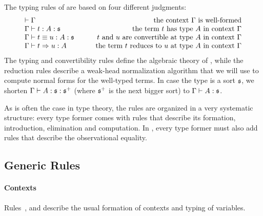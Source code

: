 The typing rules of \SetoidCC are based on four different judgments: 
\[
  \begin{array}{lr}
	\vdash \Gamma & \text{the context \( \Gamma \) is well-formed} \\
	\Gamma \vdash t : A : \mathfrak{s} & \text{the term \( t \) has type \( A \) in context \( \Gamma \)} \\
	\Gamma \vdash t \equiv u : A : \mathfrak{s} & \text{\( t \) and \( u \) are convertible at type \( A \) in context \( \Gamma \)} \\
	\Gamma \vdash t \Rightarrow u : A & \qquad\text{the term \( t \) reduces to \( u \) at type \( A \) in context \( \Gamma \)}
  \end{array}
\]
The typing and convertibility rules define the algebraic theory of 
\SetoidCC, while the reduction rules describe a weak-head normalization 
algorithm that we will use to compute normal forms for the well-typed 
terms.
% 
In case the type is a sort \( \mathfrak{s} \), we shorten 
\( \Gamma \vdash A : \mathfrak{s} : \mathfrak{s}^+ \) (where \( \mathfrak{s}^+ \) is the next 
bigger sort) to \( \Gamma \vdash A : \mathfrak{s} \).

As is often the case in type theory, the rules are organized in a very 
systematic structure:
% 
every type former comes with rules that describe its formation, introduction, 
elimination and computation.
% 
In \SetoidCC, every type former must also add rules that describe the 
observational equality.

\subsection{Generic Rules}

\paragraph*{Contexts}
Rules~,  and  describe the
usual formation of contexts and typing of variables. 
% 

